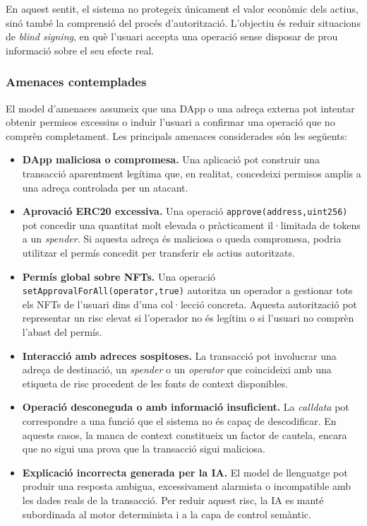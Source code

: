 En aquest sentit, el sistema no protegeix únicament el valor econòmic dels actius, sinó també la comprensió del procés d’autorització. L’objectiu és reduir situacions de \textit{blind signing}, en què l’usuari accepta una operació sense disposar de prou informació sobre el seu efecte real.

\subsubsection{Amenaces contemplades}

El model d’amenaces assumeix que una DApp o una adreça externa pot intentar obtenir permisos excessius o induir l’usuari a confirmar una operació que no comprèn completament. Les principals amenaces considerades són les següents:

\begin{itemize}
    \item \textbf{DApp maliciosa o compromesa.} Una aplicació pot construir una transacció aparentment legítima que, en realitat, concedeixi permisos amplis a una adreça controlada per un atacant.

    \item \textbf{Aprovació ERC20 excessiva.} Una operació \texttt{approve(address,uint256)} pot concedir una quantitat molt elevada o pràcticament il·limitada de tokens a un \textit{spender}. Si aquesta adreça és maliciosa o queda compromesa, podria utilitzar el permís concedit per transferir els actius autoritzats.

    \item \textbf{Permís global sobre NFTs.} Una operació \nolinkurl{setApprovalForAll(operator,true)} autoritza un operador a gestionar tots els NFTs de l’usuari dins d’una col·lecció concreta. Aquesta autorització pot representar un risc elevat si l’operador no és legítim o si l’usuari no comprèn l’abast del permís.

    \item \textbf{Interacció amb adreces sospitoses.} La transacció pot involucrar una adreça de destinació, un \textit{spender} o un \textit{operator} que coincideixi amb una etiqueta de risc procedent de les fonts de context disponibles.

    \item \textbf{Operació desconeguda o amb informació insuficient.} La \textit{calldata} pot correspondre a una funció que el sistema no és capaç de descodificar. En aquests casos, la manca de context constitueix un factor de cautela, encara que no sigui una prova que la transacció sigui maliciosa.

    \item \textbf{Explicació incorrecta generada per la IA.} El model de llenguatge pot produir una resposta ambigua, excessivament alarmista o incompatible amb les dades reals de la transacció. Per reduir aquest risc, la IA es manté subordinada al motor determinista i a la capa de control semàntic.
\end{itemize}

